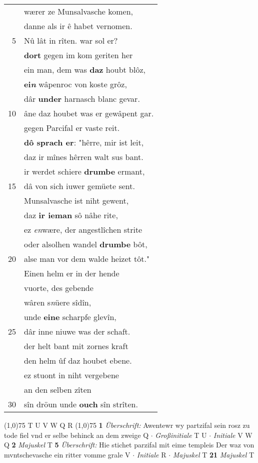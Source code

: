 \documentclass[8pt,a4paper,notitlepage]{article}
\begin{document}
\begin{table}[ht]
\begin{minipage}[t]{0.5\linewidth}
\begin{tabular}{rl}
 & wærer ze Munsalvasche komen,\\ 
 & danne als ir ê habet vernomen.\\ 
5 & Nû lât in rîten. war sol er?\\ 
 & \textbf{dort} gegen im kom geriten her\\ 
 & ein man, dem was \textbf{daz} houbt blôz,\\ 
 & \textbf{ei\textit{n}} wâpenroc von koste grôz,\\ 
 & dâr \textbf{under} harnasch blanc gevar.\\ 
10 & âne daz houbet was er gewâpent gar.\\ 
 & gegen Parcifal er vaste reit.\\ 
 & \textbf{dô sprach er}: "hêrre, mir ist leit,\\ 
 & daz ir mînes hêrren walt sus bant.\\ 
 & ir werdet schiere \textbf{drumbe} ermant,\\ 
15 & dâ von sich iuwer gemüete sent.\\ 
 & Munsalvasche ist niht gewent,\\ 
 & daz \textbf{ir ieman} sô nâhe rite,\\ 
 & ez \textit{en}wære, der angestlîchen strite\\ 
 & oder alsolhen wandel \textbf{drumbe} bôt,\\ 
20 & alse man vor dem walde heizet tôt."\\ 
 & Einen helm er in der hende\\ 
 & vuorte, des gebende\\ 
 & wâren s\textit{n}üere sîdîn,\\ 
 & unde \textbf{eine} scharpfe glevîn,\\ 
25 & dâr inne niuwe was der schaft.\\ 
 & der helt bant mit zornes kraft\\ 
 & den helm ûf daz houbet ebene.\\ 
 & ez stuont in niht vergebene\\ 
 & an den selben zîten\\ 
30 & sîn dröun unde \textbf{ouch} sîn strîten.\\ 
\end{tabular}
\scriptsize
\line(1,0){75} \newline
T U V W Q R \newline
\line(1,0){75} \newline
\textbf{1} \textit{Überschrift:} Awentewr wy partzifal sein rosz zu tode fiel vnd er selbe behinck an dem zweige Q   $\cdot$ \textit{Großinitiale} T U   $\cdot$ \textit{Initiale } V W Q  \textbf{2} \textit{Majuskel} T  \textbf{5} \textit{Überschrift:} Hie stichet parzifal mit eime templeis Der waz von mvntschevasche ein ritter vomme grale V   $\cdot$ \textit{Initiale} R   $\cdot$ \textit{Majuskel} T  \textbf{21} \textit{Majuskel} T  \newline

\end{minipage}
\end{table}
\end{document}
